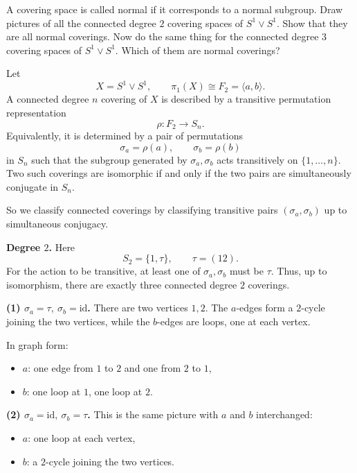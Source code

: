 \begin{problem}
A covering space is called normal if it corresponds to a normal subgroup. Draw pictures of all the connected degree \(2\) covering spaces of \(S^1\vee S^1\). Show that they are all normal coverings. Now do the same thing for the connected degree \(3\) covering spaces of \(S^1\vee S^1\). Which of them are normal coverings?
\end{problem}

\begin{solution}
Let
\[
X=S^1\vee S^1,
\qquad
\pi_1(X)\cong F_2=\langle a,b\rangle.
\]
A connected degree \(n\) covering of \(X\) is described by a transitive permutation representation
\[
\rho:F_2\to S_n.
\]
Equivalently, it is determined by a pair of permutations
\[
\sigma_a=\rho(a),\qquad \sigma_b=\rho(b)
\]
in \(S_n\) such that the subgroup generated by \(\sigma_a,\sigma_b\) acts transitively on \(\{1,\dots,n\}\). Two such coverings are isomorphic if and only if the two pairs are simultaneously conjugate in \(S_n\).

So we classify connected coverings by classifying transitive pairs \((\sigma_a,\sigma_b)\) up to simultaneous conjugacy.

\par

\textbf{Degree \(2\).}
Here
\[
S_2=\{1,\tau\},
\qquad
\tau=(12).
\]
For the action to be transitive, at least one of \(\sigma_a,\sigma_b\) must be \(\tau\). Thus, up to isomorphism, there are exactly three connected degree \(2\) coverings.

\par

\textbf{(1) \(\sigma_a=\tau,\ \sigma_b=\mathrm{id}\).}
There are two vertices \(1,2\). The \(a\)-edges form a \(2\)-cycle joining the two vertices, while the \(b\)-edges are loops, one at each vertex.

In graph form:
\begin{itemize}
	\item \(a\): one edge from \(1\) to \(2\) and one from \(2\) to \(1\),
	\item \(b\): one loop at \(1\), one loop at \(2\).
\end{itemize}

\par

\textbf{(2) \(\sigma_a=\mathrm{id},\ \sigma_b=\tau\).}
This is the same picture with \(a\) and \(b\) interchanged:
\begin{itemize}
	\item \(a\): one loop at each vertex,
	\item \(b\): a \(2\)-cycle joining the two vertices.
\end{itemize}


\end{solution}
